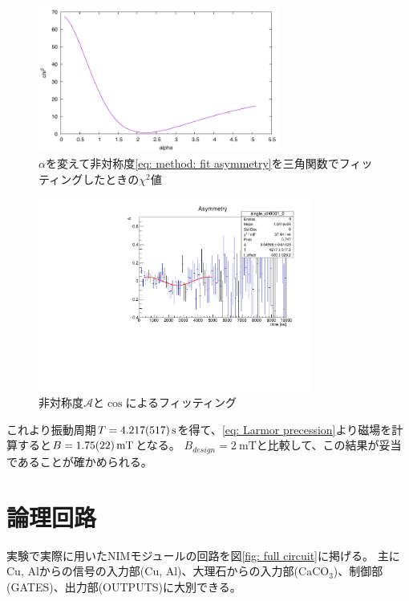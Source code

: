 \documentclass[dvipdfmx]{jsarticle}
\begin{document}
\begin{figure}
    \centering
    \includegraphics[width=8cm]{../analysis/Larmor/ver2/alpha-chi2.pdf}
    \caption{$\alpha$を変えて非対称度\eqref{eq: method: fit asymmetry}を三角関数でフィッティングしたときの$\chi^2$値}
    \label{fig: result: alpha and chi square}
\end{figure}

\begin{figure}
    \centering
    \includegraphics[width=9cm]{../analysis/Larmor/ver2/asymmetry.pdf}
    \caption{非対称度$\mathscr{A}$と$\cos$によるフィッティング}
    \label{fig: result: asymmetry}
\end{figure}

これより振動周期$T=\SI{4.217\pm0.517}{\second}$を得て、\eqref{eq: Larmor precession}より磁場を計算すると$B=\SI{1.75+-0.22}{\milli\tesla}$となる。
$B_{design}=\SI{2}{\milli\tesla}$と比較して、この結果が妥当であることが確かめられる。


\appendix


\section{論理回路}
\label{sec: logic circuit}

実験で実際に用いたNIMモジュールの回路を図\ref{fig: full circuit}に掲げる。
主にCu, Alからの信号の入力部(Cu, Al)、大理石からの入力部($\mathrm{CaCO_3}$)、制御部(GATES)、出力部(OUTPUTS)に大別できる。
\end{document}
